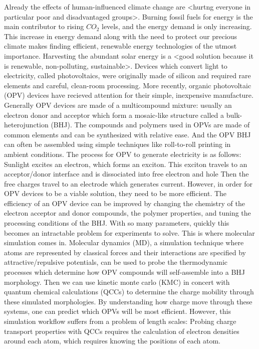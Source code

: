 Already the effects of human-influenced climate change are <hurtng everyone in particular poor and disadvantaged groups>.
Burning fossil fuels for energy is the main contributor to rising $CO_{2}$ levels, and the energy demand is only increasing.
This increase in energy demand along with the need to protect our precious climate makes finding efficient, renewable energy technologies of the utmost importance.
Harvesting the abundant solar energy is a <good solution because it is renewable, non-polluting, sustainable>.
Devices which convert light to electricity, called photovoltaics, were originally made of silicon and required rare elements and careful, clean-room processing.
More recently, organic photovoltaic (OPV) devices have recieved attention for their simple, inexpensive manufacture.
Generally OPV devices are made of a multicompound mixture: usually an electron donor and acceptor which form a mosaic-like structure called a bulk-heterojunction (BHJ).
The compounds and polymers used in OPVs are made of common elements and can be synthesized with relative ease.
And the OPV BHJ can often be assembled using simple techniques like roll-to-roll printing in ambient conditions.
The process for OPV to generate electricity is as follows: 
Sunlight excites an electron, which forms an exciton.
This exciton travels to an acceptor/donor interface and is dissociated into free electron and hole
Then the free charges travel to an electrode which generates current.
However, in order for OPV devices to be a viable solution, they need to be more efficient.
The efficiency of an OPV device can be improved by changing the chemistry of the electron acceptor and donor compounds, the polymer properties, and tuning the processing conditions of the BHJ.
With so many parameters, quickly this becomes an intractable problem for experiments to solve.
This is where molecular simulation comes in. 
Molecular dynamics (MD), a simulation technique where atoms are represented by classical forces and their interactions are specified by attractive/repulsive potentials, can be used to probe the thermodynamic processes which determine how OPV compounds will self-assemble into a BHJ morphology.
Then we can use kinetic monte carlo (KMC) in concert with quantum chemical calculations (QCCs) to determine the charge mobility through these simulated morphologies.
By understanding how charge move through these systems, one can predict which OPVs will be most efficient.
However, this simulation workflow suffers from a problem of length scales:
Probing charge transport properties with QCCs requires the calculation of electron densities around each atom, which requires knowing the positions of each atom.
